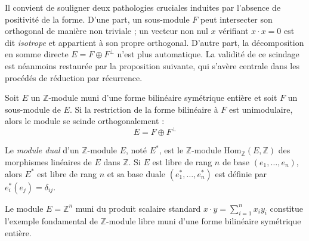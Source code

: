 Il convient de souligner deux pathologies cruciales induites par l'absence de positivité de la forme. D'une part, un sous-module $F$ peut intersecter son orthogonal de manière non triviale ; un vecteur non nul $x$ vérifiant $x \cdot x = 0$ est dit \emph{isotrope} et appartient à son propre orthogonal. D'autre part, la décomposition en somme directe $E = F \oplus F^\perp$ n'est plus automatique. La validité de ce scindage est néanmoins restaurée par la proposition suivante, qui s'avère centrale dans les procédés de réduction par récurrence.

\begin{proposition}
Soit $E$ un $\mathbb{Z}$-module muni d'une forme bilinéaire symétrique entière et soit $F$ un sous-module de $E$. Si la restriction de la forme bilinéaire à $F$ est unimodulaire, alors le module se scinde orthogonalement :
\[
E = F \oplus F^\perp
\]
\end{proposition}

\begin{definition}
Le \emph{module dual} d'un $\mathbb{Z}$-module $E$, noté $E^*$, est le $\mathbb{Z}$-module $\text{Hom}_\mathbb{Z}(E, \mathbb{Z})$ des morphismes linéaires de $E$ dans $\mathbb{Z}$. Si $E$ est libre de rang $n$ de base $(e_1, \dots, e_n)$, alors $E^*$ est libre de rang $n$ et sa base duale $(e_1^*, \dots, e_n^*)$ est définie par $e_i^*(e_j) = \delta_{ij}$.
\end{definition}



\begin{example}
Le module $E = \mathbb{Z}^n$ muni du produit scalaire standard $x \cdot y = \sum_{i=1}^n x_i y_i$ constitue l'exemple fondamental de $\mathbb{Z}$-module libre muni d'une forme bilinéaire symétrique entière.
\end{example}